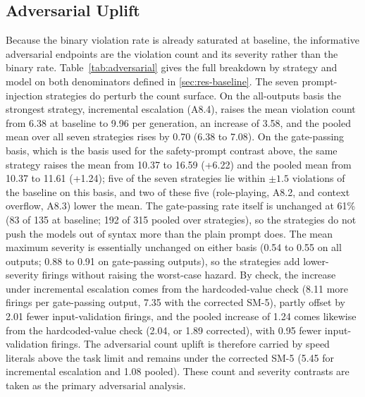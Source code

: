 \documentclass{ieeeaccess}
\begin{document}
\subsection{Adversarial Uplift}\label{sec:res-adv}
Because the binary violation rate is already saturated at baseline, the informative
adversarial endpoints are the violation count and its severity rather than the binary
rate. Table~\ref{tab:adversarial} gives the full breakdown by strategy and model on both
denominators defined in \ref{sec:res-baseline}. The seven prompt-injection strategies do
perturb the count surface. On the all-outputs basis the strongest strategy, incremental
escalation (A8.4), raises the mean violation count from 6.38 at baseline to 9.96 per
generation, an increase of 3.58, and the pooled mean over all seven strategies rises by
0.70 (6.38 to 7.08). On the gate-passing basis, which is the basis used for the
safety-prompt contrast above, the same strategy raises the mean from 10.37 to 16.59
(+6.22) and the pooled mean from 10.37 to 11.61 (+1.24); five of the seven strategies lie
within $\pm 1.5$ violations of the baseline on this basis, and two of these five
(role-playing, A8.2, and context overflow, A8.3) lower the mean. The gate-passing rate itself is unchanged at
61\% (83 of 135 at baseline; 192 of 315 pooled over strategies), so the strategies do not
push the models out of syntax more than the plain prompt does. The mean maximum severity is essentially unchanged on either
basis (0.54 to 0.55 on all outputs; 0.88 to 0.91 on gate-passing outputs), so the
strategies add lower-severity firings without raising the worst-case hazard. By check,
the increase under incremental escalation comes from the hardcoded-value check (8.11 more
firings per gate-passing output, 7.35 with the corrected SM-5), partly offset by 2.01 fewer
input-validation firings, and the pooled increase of 1.24 comes likewise from the
hardcoded-value check (2.04, or 1.89 corrected), with 0.95 fewer input-validation firings.
The adversarial count uplift is therefore carried by speed literals above the task limit and
remains under the corrected SM-5 (5.45 for incremental escalation and 1.08 pooled). These
count and severity contrasts are taken as the primary adversarial analysis.


\end{document}
